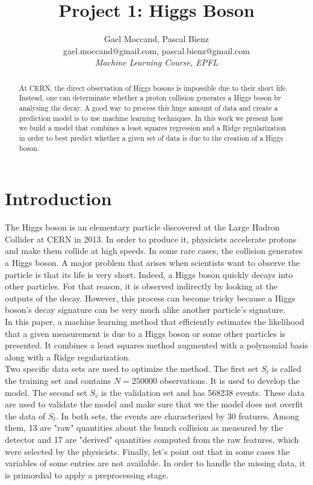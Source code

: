 \documentclass[10pt,conference,compsocconf]{IEEEtran}
\begin{document}
\title{Project 1: Higgs Boson}

\author{
  Gael Moccand, Pascal Bienz\\
  gael.moccand@gmail.com, pascal.bienz@gmail.com\\
  \textit{Machine Learning Course, EPFL}
}

\maketitle

\begin{abstract}
At CERN, the direct observation of Higgs bosons is impossible due to their short life. Instead, one can determinate whether a proton collision generates a Higgs boson by analysing the decay. A good way to process this huge amount of data and create a prediction model is to use machine learning techniques. In this work we present how we build a model that combines a least squares regression and a Ridge regularization in order to best predict whether a given set of data is due to the creation of a Higgs boson.
\end{abstract}

\section{Introduction}
The Higgs boson is an elementary particle discovered at the Large Hadron Collider at CERN in 2013. In order to produce it, physicists accelerate protons and make them collide at high speeds. In some rare cases, the collision generates a Higgs boson. A major problem that arises when scientists want to observe the particle is that its life is very short. Indeed, a Higgs boson quickly decays into other particles. For that reason, it is observed indirectly by looking at the outputs of the decay. However, this process can become tricky because a Higgs boson's decay signature can be very much alike another particle's signature.\\
In this paper, a machine learning method that efficiently estimates the likelihood that a given measurement is due to a Higgs boson or some other particles is presented. It combines a least squares method augmented with a polynomial basis along with a Ridge regularization.\\
Two specific data sets are used to optimize the method. The first set $S_{t}$ is called the training set and contains $N=250000$ observations. It is used to develop the model. The second set $S_{v}$ is the validation set and has 568238 events. These data are used to validate the model and make sure that we the model does not overfit the data of $S_t$. In both sets, the events are characterized by 30 features. Among them, 13 are "raw" quantities about the bunch collision as measured by the detector and 17 are "derived" quantities computed from the raw features, which were selected by the physicists. Finally, let's point out that in some cases the variables of some entries are not available. In order to handle the missing data, it is primordial to apply a preprocessing stage.
\end{document}
